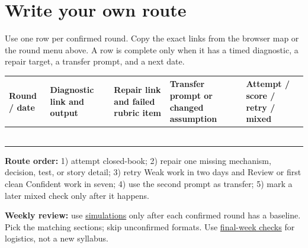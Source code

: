 \documentclass[10pt,letterpaper]{article}
\begin{document}
\newpage
\section*{Write your own route}
Use one row per confirmed round. Copy the exact links from the browser map or the round menu above. A row is complete only when it has a timed diagnostic, a repair target, a transfer prompt, and a next date.
\renewcommand{\arraystretch}{1.2}
\begin{tabularx}{\linewidth}{@{}p{.15\linewidth} X X X p{.16\linewidth}@{}}
\toprule
Round / date & Diagnostic link and output & Repair link and failed rubric item & Transfer prompt or changed assumption & Attempt / score / retry / mixed \\
\midrule
\rule{0pt}{.62in} & & & & \\
\midrule
\rule{0pt}{.62in} & & & & \\
\midrule
\rule{0pt}{.62in} & & & & \\
\midrule
\rule{0pt}{.62in} & & & & \\
\midrule
\rule{0pt}{.62in} & & & & \\
\midrule
\rule{0pt}{.62in} & & & & \\
\bottomrule
\end{tabularx}
\vspace{.1in}
\textbf{Route order:} 1) attempt closed-book; 2) repair one missing mechanism, decision, test, or story detail; 3) retry Weak work in two days and Review or first clean Confident work in seven; 4) use the second prompt as transfer; 5) mark a later mixed check only after it happens.
\par\smallskip
\textbf{Weekly review:} use \href{https://mlmentorship.com/prep/simulations/}{simulations} only after each confirmed round has a baseline. Pick the matching sections; skip unconfirmed formats. Use \href{https://mlmentorship.com/prep/final-week/}{final-week checks} for logistics, not a new syllabus.

\newpage
\end{document}
